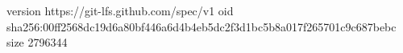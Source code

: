 version https://git-lfs.github.com/spec/v1
oid sha256:00ff2568dc19d6a80bf446a6d4b4eb5dc2f3d1bc5b8a017f265701c9c687bebc
size 2796344
